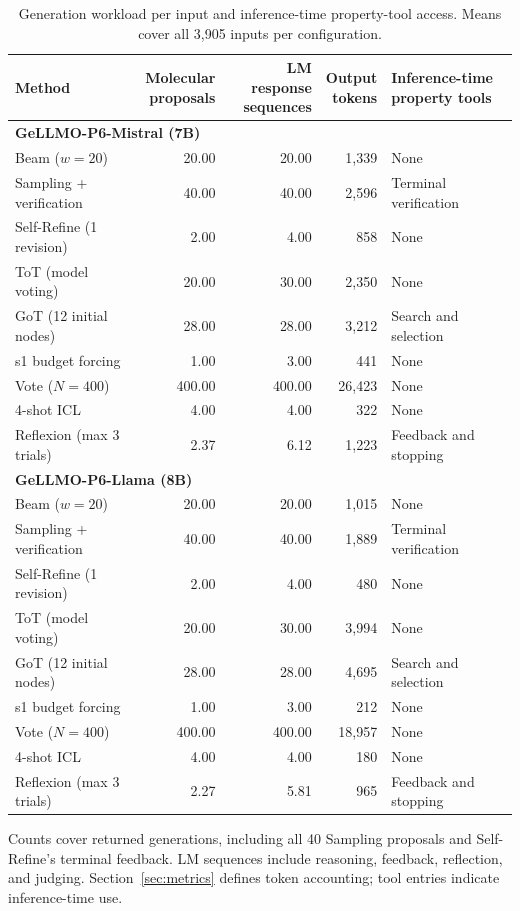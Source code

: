 \begin{table}[t]
\centering\EvalTableFont
\setlength{\tabcolsep}{3pt}\renewcommand{\arraystretch}{1.10}
\caption{Generation workload per input and inference-time property-tool access. Means cover all 3,905 inputs per configuration.}
\label{tab:workload}\label{tab:tts_efficiency}
\begin{tabular*}{\linewidth}{@{\extracolsep{\fill}}l r r r l@{}}
\toprule
Method & \shortstack{Molecular\\proposals} & \shortstack{LM response\\sequences} & \shortstack{Output\\tokens} & \shortstack[l]{Inference-time\\property tools} \\
\midrule
\multicolumn{5}{l}{\textbf{GeLLMO-P6-Mistral (7B)}} \\
Beam ($w=20$) & 20.00 & 20.00 & 1,339 & None \\
Sampling + verification & 40.00 & 40.00 & 2,596 & Terminal verification \\
Self-Refine (1 revision) & 2.00 & 4.00 & 858 & None \\
ToT (model voting) & 20.00 & 30.00 & 2,350 & None \\
GoT (12 initial nodes) & 28.00 & 28.00 & 3,212 & Search and selection \\
s1 budget forcing & 1.00 & 3.00 & 441 & None \\
Vote ($N=400$) & 400.00 & 400.00 & 26,423 & None \\
4-shot ICL & 4.00 & 4.00 & 322 & None \\
Reflexion (max 3 trials) & 2.37 & 6.12 & 1,223 & Feedback and stopping \\
\midrule
\multicolumn{5}{l}{\textbf{GeLLMO-P6-Llama (8B)}} \\
Beam ($w=20$) & 20.00 & 20.00 & 1,015 & None \\
Sampling + verification & 40.00 & 40.00 & 1,889 & Terminal verification \\
Self-Refine (1 revision) & 2.00 & 4.00 & 480 & None \\
ToT (model voting) & 20.00 & 30.00 & 3,994 & None \\
GoT (12 initial nodes) & 28.00 & 28.00 & 4,695 & Search and selection \\
s1 budget forcing & 1.00 & 3.00 & 212 & None \\
Vote ($N=400$) & 400.00 & 400.00 & 18,957 & None \\
4-shot ICL & 4.00 & 4.00 & 180 & None \\
Reflexion (max 3 trials) & 2.27 & 5.81 & 965 & Feedback and stopping \\
\bottomrule\end{tabular*}
\par\vspace{5pt}\noindent\begin{minipage}{\linewidth}\TableNoteFont
Counts cover returned generations, including all 40 Sampling proposals and Self-Refine's terminal feedback. LM sequences include reasoning, feedback, reflection, and judging. Section~\ref{sec:metrics} defines token accounting; tool entries indicate inference-time use.
\end{minipage}
\end{table}
